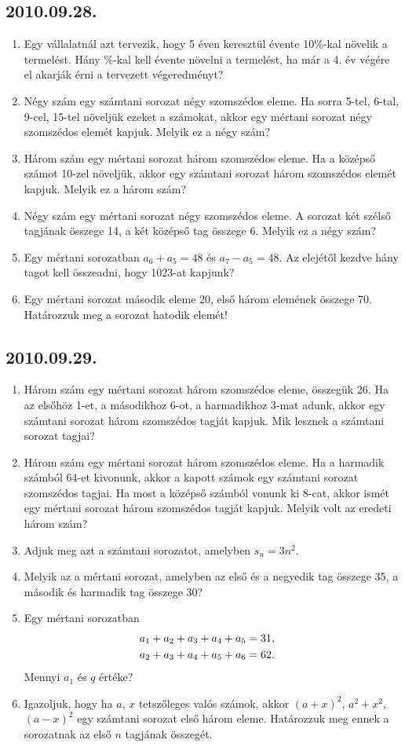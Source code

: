 \documentclass{article}
\begin{document}
\subsection*{2010.09.28.}
\begin{enumerate}
\item Egy vállalatnál azt tervezik, hogy 5 éven keresztül évente 10\%-kal növelik a termelést. Hány \%-kal kell évente növelni a termelést, ha már a 4. év végére el akarják érni a tervezett végeredményt?
\item Négy szám egy számtani sorozat négy szomszédos eleme. Ha sorra 5-tel, 6-tal, 9-cel, 15-tel növeljük ezeket a számokat, akkor egy mértani sorozat négy szomszédos elemét kapjuk. Melyik ez a négy szám?
\item Három szám egy mértani sorozat három szomszédos eleme. Ha a középső számot 10-zel növeljük, akkor egy számtani sorozat három szomszédos elemét kapjuk. Melyik ez a három szám?
\item Négy szám egy mértani sorozat négy szomszédos eleme. A sorozat két szélső tagjának összege 14, a két középső tag összege 6. Melyik ez a négy szám?
\item Egy mértani sorozatban $a_6+a_5=48$ és $a_7-a_5=48$. Az elejétől kezdve hány tagot kell összeadni, hogy 1023-at kapjunk?
\item Egy mértani sorozat második eleme 20, első három elemének összege 70. Határozzuk meg a sorozat hatodik elemét!
\end{enumerate}


\subsection*{2010.09.29.}
\begin{enumerate}
\item Három szám egy mértani sorozat három szomszédos eleme, összegük 26. Ha az elsőhöz 1-et, a másodikhoz 6-ot, a harmadikhoz 3-mat adunk, akkor egy számtani sorozat három szomszédos tagját kapjuk. Mik lesznek a számtani sorozat tagjai?
\item Három szám egy mértani sorozat három szomszédos eleme. Ha a harmadik számból 64-et kivonunk, akkor a kapott számok egy számtani sorozat szomszédos tagjai. Ha most a középső számból vonunk ki 8-cat, akkor ismét egy mértani sorozat három szomszédos tagját kapjuk. Melyik volt az eredeti három szám?
\item Adjuk meg azt a számtani sorozatot, amelyben
$s_n=3n^2$.
\item Melyik az a mértani sorozat, amelyben az első és a negyedik tag összege 35, a második és harmadik tag összege 30?
\item Egy mértani sorozatban
\begin{align*}
a_1+a_2+a_3+a_4+a_5&=31,\cr
a_2+a_3+a_4+a_5+a_6&=62.
\end{align*}
Mennyi $a_1$ és $q$ értéke?
\item Igazoljuk, hogy ha $a$, $x$ tetszőleges valós számok, akkor
$(a+x)^2$, $a^2+x^2$, $(a-x)^2$ egy számtani sorozat első három eleme. Határozzuk meg ennek a sorozatnak az első $n$ tagjának összegét.
\end{enumerate}
\end{document}
